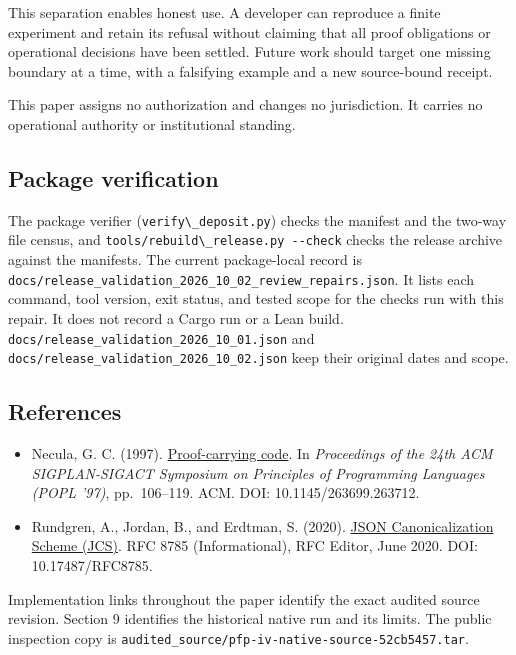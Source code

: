 \documentclass[
  11pt,
]{article}
\newcommand{\passthrough}[1]{#1}
\providecommand{\tightlist}{%
  \setlength{\itemsep}{0pt}\setlength{\parskip}{0pt}}
\begin{document}
This separation enables honest use. A developer can reproduce a finite
experiment and retain its refusal without claiming that all proof
obligations or operational decisions have been settled. Future work
should target one missing boundary at a time, with a falsifying example
and a new source-bound receipt.

This paper assigns no authorization and changes no jurisdiction. It
carries no operational authority or institutional standing.

\subsection{Package verification}\label{package-verification}

The package verifier (\passthrough{\lstinline!verify\_deposit.py!})
checks the manifest and the two-way file census, and
\passthrough{\lstinline!tools/rebuild\_release.py --check!} checks the
release archive against the manifests. The current package-local record
is \nolinkurl{docs/release_validation_2026_10_02_review_repairs.json}.
It lists each command, tool version, exit status, and tested scope for
the checks run with this repair. It does not record a Cargo run or a
Lean build. \nolinkurl{docs/release_validation_2026_10_01.json} and
\nolinkurl{docs/release_validation_2026_10_02.json} keep their original
dates and scope.

\subsection{References}\label{references}

\begin{itemize}
\tightlist
\item
  Necula, G. C. (1997).
  \href{https://doi.org/10.1145/263699.263712}{Proof-carrying code}. In
  \emph{Proceedings of the 24th ACM SIGPLAN-SIGACT Symposium on
  Principles of Programming Languages (POPL '97)}, pp.~106--119. ACM.
  DOI: 10.1145/263699.263712.
\item
  Rundgren, A., Jordan, B., and Erdtman, S. (2020).
  \href{https://doi.org/10.17487/RFC8785}{JSON Canonicalization Scheme
  (JCS)}. RFC 8785 (Informational), RFC Editor, June 2020. DOI:
  10.17487/RFC8785.
\end{itemize}

Implementation links throughout the paper identify the exact audited
source revision. Section 9 identifies the historical native run and its
limits. The public inspection copy is
\nolinkurl{audited_source/pfp-iv-native-source-52cb5457.tar}.
\end{document}
